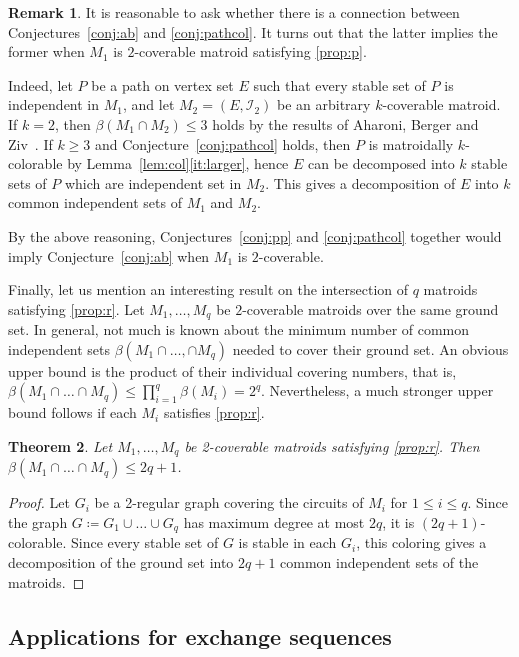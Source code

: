 \documentclass[11pt,a4paper]{article}
\theoremstyle{plain}
\newtheorem{thm}{Theorem}
\theoremstyle{definition}
\newtheorem{rem}[thm]{Remark}
\newcommand{\cI}{\mathcal{I}}
\begin{document}
\begin{rem} 
\normalfont
It is reasonable to ask whether there is a connection between Conjectures~\ref{conj:ab} and \ref{conj:pathcol}. It turns out that the latter implies the former when $M_1$ is $2$-coverable matroid satisfying \ref{prop:p}.

Indeed, let $P$ be a path on vertex set $E$ such that every stable set of $P$ is independent in $M_1$,  and let $M_2=(E,\cI_2)$ be an arbitrary $k$-coverable matroid. If $k=2$, then $\beta(M_1\cap M_2) \le 3$ holds by the results of Aharoni, Berger and Ziv~\cite{aharoni2012edge}. If $k \ge 3$ and Conjecture~\ref{conj:pathcol} holds, then $P$ is matroidally $k$-colorable by Lemma~\ref{lem:col}\ref{it:larger}, hence $E$ can be decomposed into $k$ stable sets of $P$ which are independent set in $M_2$. This gives a decomposition of $E$ into $k$ common independent sets of $M_1$ and $M_2$. 

By the above reasoning, Conjectures~\ref{conj:pp} and \ref{conj:pathcol} together would imply Conjecture~\ref{conj:ab} when $M_1$ is $2$-coverable. 
\end{rem}

Finally, let us mention an interesting result on the intersection of $q$ matroids satisfying \ref{prop:r}. Let $M_1,\dots,M_q$ be $2$-coverable matroids over the same ground set. In general, not much is known about the minimum number of common independent sets $\beta(M_1\cap\dots,\cap M_q)$ needed to cover their ground set. An obvious upper bound is the product of their individual covering numbers, that is, $\beta(M_1\cap\dots\cap M_q)\leq\prod_{i=1}^q \beta(M_i)=2^q$. Nevertheless, a much stronger upper bound follows if each $M_i$ satisfies \ref{prop:r}.  

\begin{thm} 
Let $M_1, \dots, M_q$ be 2-coverable matroids satisfying \ref{prop:r}. Then $\beta(M_1 \cap \dots \cap M_q) \le 2q+1$.
\end{thm}
\begin{proof}
Let $G_i$ be a 2-regular graph covering the circuits of $M_i$ for $1 \le i \le q$. Since the graph $G \coloneqq G_1 \cup \dots \cup G_q$ has maximum degree at most $2q$, it is $(2q+1)$-colorable. Since every stable set of $G$ is stable in each $G_i$, this coloring gives a decomposition of the ground set into $2q+1$ common independent sets of the matroids. 
\end{proof}

\subsection{Applications for exchange sequences}
\label{sec:gabow}
\end{document}
